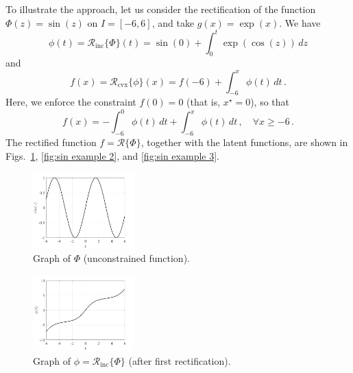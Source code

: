 \begin{remark}
To illustrate the approach, let us consider the rectification of the function $\Phi(z) = \sin(z)$ on $I = [-6, 6]$, and take $g(x) = \exp(x)$. We have 
\begin{equation}
    \phi(t) = \mathcal{R}_{\mathrm{inc}}\{\Phi\}(t) = \sin(0) + \int_0^t \exp\left(\cos(z)\right)\,dz
\end{equation}
and
\begin{equation}
    f(x) = \mathcal{R}_{\mathrm{cvx}}\{\phi\}(x) = f(-6) + \int_{-6}^x \phi(t)\,dt\,.
\end{equation}
Here, we enforce the constraint $f(0) = 0$ (that is, $x^\star = 0$), so that
\begin{equation}
    f(x) = - \int_{-6}^{0} \phi(t)\,dt + \int_{-6}^x \phi(t)\,dt\,, \quad \forall x \geq -6\,. 
\end{equation}
The rectified function $f = \mathcal{R}\{\Phi\}$, together with the latent functions, are shown in Figs.~\ref{fig:sin example 1}, \ref{fig:sin example 2}, and \ref{fig:sin example 3}. 
\begin{figure}[ht!]
    \begin{center}
        \includegraphics[width=0.35\textwidth]{Pictures/sin.png}
    \end{center}
    \caption[Graph of $\Phi$.]{Graph of $\Phi$ (unconstrained function).}
        \label{fig:sin example 1}
\end{figure}
\begin{figure}[ht!]
    \begin{center}
        \includegraphics[width=0.35\textwidth]{Pictures/increased_sin.png}
    \end{center}
    \caption[Graph of $\phi = \mathcal{R}_{\mathrm{inc}}\{\Phi\}$.]{Graph of $\phi = \mathcal{R}_{\mathrm{inc}}\{\Phi\}$ (after first rectification).}

\end{figure}
\end{remark}
